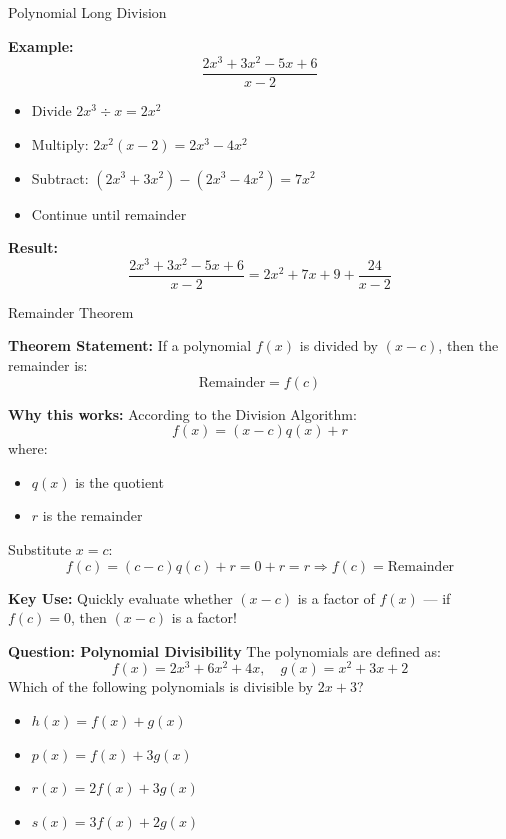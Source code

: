 \documentclass{beamer}
\begin{document}
\begin{frame}{Polynomial Long Division}

\vspace{0.3cm}
\textbf{Example:}
\[
\frac{2x^3 + 3x^2 - 5x + 6}{x - 2}
\]
\begin{itemize}
    \item Divide $2x^3 \div x = 2x^2$
    \item Multiply: $2x^2(x - 2) = 2x^3 - 4x^2$
    \item Subtract: $(2x^3 + 3x^2) - (2x^3 - 4x^2) = 7x^2$
    \item Continue until remainder
\end{itemize}

\vspace{0.2cm}
\textbf{Result:} 
\[
\frac{2x^3 + 3x^2 - 5x + 6}{x - 2} = 2x^2 + 7x + 9 + \frac{24}{x - 2}
\]
    
\end{frame}

\begin{frame}{Remainder Theorem}
\small

\textbf{Theorem Statement:}  
If a polynomial $f(x)$ is divided by $(x - c)$, then the remainder is:
\[
\text{Remainder} = f(c)
\]

\vspace{0.3cm}
\textbf{Why this works:}  
According to the Division Algorithm:
\[
f(x) = (x - c)q(x) + r
\]
where:
\begin{itemize}
    \item $q(x)$ is the quotient
    \item $r$ is the remainder
\end{itemize}

Substitute $x = c$:
\[
f(c) = (c - c)q(c) + r = 0 + r = r
\Rightarrow \boxed{f(c) = \text{Remainder}}
\]

\vspace{0.3cm}
\textbf{Key Use:}  
Quickly evaluate whether $(x - c)$ is a factor of $f(x)$ — if $f(c) = 0$, then $(x - c)$ is a factor!

\end{frame}

\begin{frame}{\textbf{Question: Polynomial Divisibility}}
The polynomials are defined as:
\[
f(x) = 2x^3 + 6x^2 + 4x, \quad g(x) = x^2 + 3x + 2
\]
Which of the following polynomials is divisible by \( 2x + 3 \)?

\begin{itemize}
    \item[A.] \( h(x) = f(x) + g(x) \)
    \item[B.] \( p(x) = f(x) + 3g(x) \)
    \item[C.] \( r(x) = 2f(x) + 3g(x) \)
    \item[D.] \( s(x) = 3f(x) + 2g(x) \)
\end{itemize}
\end{frame}
\end{document}
